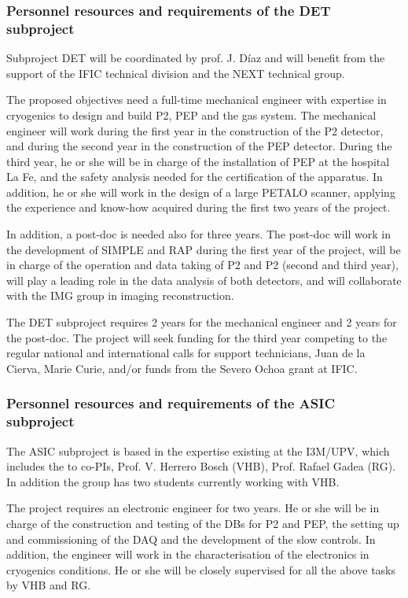 \subsubsection*{Personnel resources and requirements of the DET subproject}

Subproject DET will be coordinated by prof. J. D\'iaz and will benefit from the support of the IFIC technical division and the NEXT technical group. 

The proposed objectives need a full-time mechanical engineer with expertise in cryogenics to design and build P2, PEP and the gas system. The mechanical engineer will work during the first year in the construction of the P2 detector, and during the second year in the construction of the PEP detector. During the third year, he or she will be in charge of the installation of PEP at the hospital La Fe, and the safety analysis needed for the certification of the apparatus. In addition, he or she will work in the design of a large PETALO scanner, applying the experience and know-how acquired during the first two years of the project.

In addition, a post-doc is needed also for three years. The post-doc will work in the development of SIMPLE and RAP during the first year of the project, will be in charge of the operation and data taking of P2 and P2 (second and third year), will play a leading role in the data analysis of both detectors, and will collaborate with the IMG group in imaging reconstruction. 

The DET subproject requires 2 years for the mechanical engineer and 2 years for the post-doc. The project will seek funding for the third year competing to the regular national and international calls for support technicians, Juan de la Cierva, Marie Curie, and/or funds from the Severo Ochoa grant at IFIC. 
\subsubsection*{Personnel resources and requirements of the ASIC subproject} 

The ASIC subproject is based in the expertise existing  at the I3M/UPV, which includes the to co-PIs, Prof. V. Herrero Bosch (VHB), Prof. Rafael Gadea (RG). 
In addition the group has two students currently working with VHB.

The project requires an electronic engineer for two years. He or she will be in charge of the construction and testing of the DBs for P2 and PEP, the setting up and commissioning of the DAQ and the development of the slow controls. In addition, the engineer will work in the characterisation of the electronics in cryogenics conditions. He or she will be closely supervised for all the above tasks by VHB and RG. 

